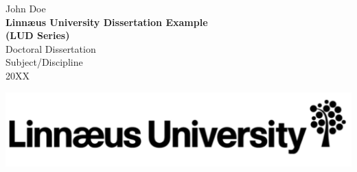 \begin{center}

\null\vspace{4.5cm}
\normalsize   John Doe\\[1.5cm]
{ \Large \bfseries Linn{\ae}us University Dissertation Example\\[0.3cm](LUD Series)}%
\\[2cm]

Doctoral Dissertation\\[0.2cm]
Subject/Discipline\\[0.4cm]
20XX
\vfill

\draftstamp

\includegraphics[scale=0.2]{images/lnu.pdf}%

\end{center}

\overlaypagenote

\cleardoublepage
